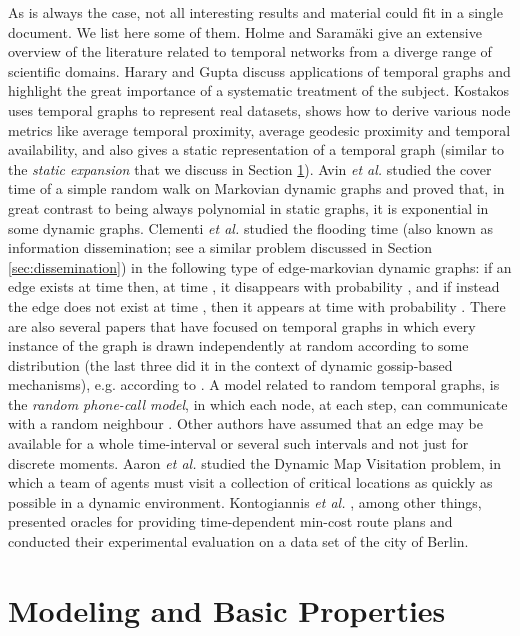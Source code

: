 \documentclass[oribibl, 11pt]{llncs}
\begin{document}
As is always the case, not all interesting results and material could fit in a single document. We list here some of them. Holme and Saram{\" a}ki \cite{HS12} give an extensive overview of the literature related to temporal networks from a diverge range of scientific domains. Harary and Gupta \cite{HG97} discuss applications of temporal graphs and highlight the great importance of a systematic treatment of the subject. Kostakos \cite{Ko09} uses temporal graphs to represent real datasets, shows how to derive various node metrics like average temporal proximity, average geodesic proximity and temporal availability, and also gives a static representation of a temporal graph (similar to the \emph{static expansion} that we discuss in Section \ref{sec:model}). Avin \emph{et al.} \cite{AKL08} studied the cover time of a simple random walk on Markovian dynamic graphs and proved that, in great contrast to being always polynomial in static graphs, it is exponential in some dynamic graphs. Clementi \emph{et al.} \cite{CFTE08} studied the flooding time (also known as information dissemination; see a similar problem discussed in Section \ref{sec:dissemination}) in the following type of edge-markovian dynamic graphs: if an edge exists at time  then, at time , it disappears with probability , and if instead the edge does not exist at time , then it appears at time  with probability . There are also several papers that have focused on temporal graphs in which every instance of the graph is drawn independently at random according to some distribution \cite{CPMS07,HHL88,Pi87,KK02} (the last three did it in the context of dynamic gossip-based mechanisms), e.g. according to . A model related to random temporal graphs, is the \emph{random phone-call model}, in which each node, at each step, can communicate with a random neighbour \cite{DGH87,KSSV00}. Other authors \cite{XFJ03,FT98} have assumed that an edge may be available for a whole time-interval  or several such intervals and not just for discrete moments. Aaron \emph{et al.} \cite{AKM14} studied the {\sc Dynamic Map Visitation} problem, in which a team of agents must visit a collection of critical locations as quickly as possible in a dynamic environment. Kontogiannis \emph{et al.} \cite{KMP15}, among other things, presented oracles for providing time-dependent min-cost route plans and conducted their experimental evaluation on a data set of the city of Berlin. 

\section{Modeling and Basic Properties}
\label{sec:model}
\end{document}
